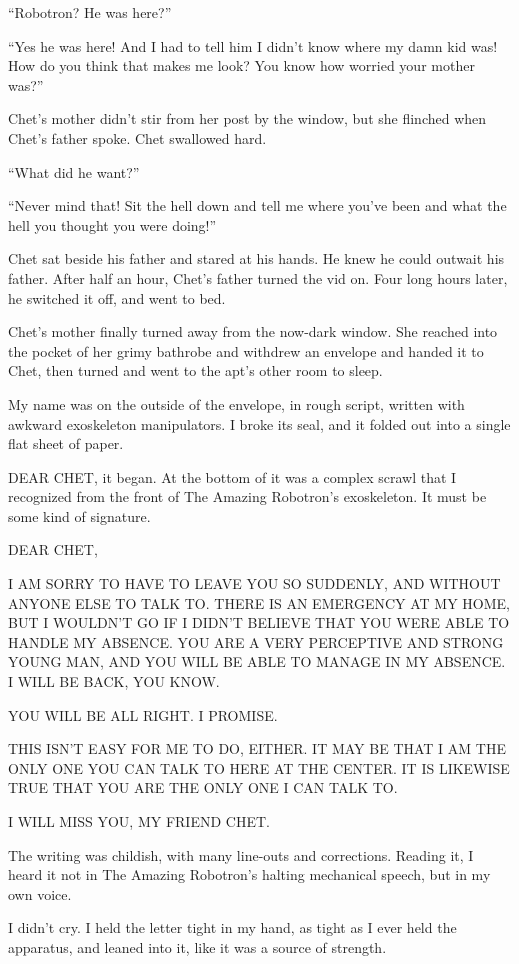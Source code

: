 ``Robotron? He was here?''

``Yes he was here! And I had to tell him I didn't know where my damn kid was! 
How do you think that makes me look? You know how worried your mother was?''

Chet's mother didn't stir from her post by the window, but she
flinched when Chet's father spoke. Chet swallowed hard.

``What did he want?''

``Never mind that! Sit the hell down and tell me where you've been and what the 
hell you thought you were doing!''

Chet sat beside his father and stared at his hands. He knew he
could outwait his father. After half an hour, Chet's father turned
the vid on. Four long hours later, he switched it off, and went to
bed.

Chet's mother finally turned away from the now-dark window. She
reached into the pocket of her grimy bathrobe and withdrew an
envelope and handed it to Chet, then turned and went to the apt's
other room to sleep.

My name was on the outside of the envelope, in rough script,
written with awkward exoskeleton manipulators. I broke its seal,
and it folded out into a single flat sheet of paper.

DEAR CHET, it began. At the bottom of it was a complex scrawl that
I recognized from the front of The Amazing Robotron's exoskeleton.
It must be some kind of signature.

DEAR CHET,

I AM SORRY TO HAVE TO LEAVE YOU SO SUDDENLY, AND WITHOUT ANYONE
ELSE TO TALK TO. THERE IS AN EMERGENCY AT MY HOME, BUT I WOULDN'T
GO IF I DIDN'T BELIEVE THAT YOU WERE ABLE TO HANDLE MY ABSENCE. YOU
ARE A VERY PERCEPTIVE AND STRONG YOUNG MAN, AND YOU WILL BE ABLE TO
MANAGE IN MY ABSENCE. I WILL BE BACK, YOU KNOW.

YOU WILL BE ALL RIGHT. I PROMISE.

THIS ISN'T EASY FOR ME TO DO, EITHER. IT MAY BE THAT I AM THE ONLY
ONE YOU CAN TALK TO HERE AT THE CENTER. IT IS LIKEWISE TRUE THAT
YOU ARE THE ONLY ONE I CAN TALK TO.

I WILL MISS YOU, MY FRIEND CHET.

The writing was childish, with many line-outs and corrections.
Reading it, I heard it not in The Amazing Robotron's halting
mechanical speech, but in my own voice.

I didn't cry. I held the letter tight in my hand, as tight as I
ever held the apparatus, and leaned into it, like it was a source
of strength.

